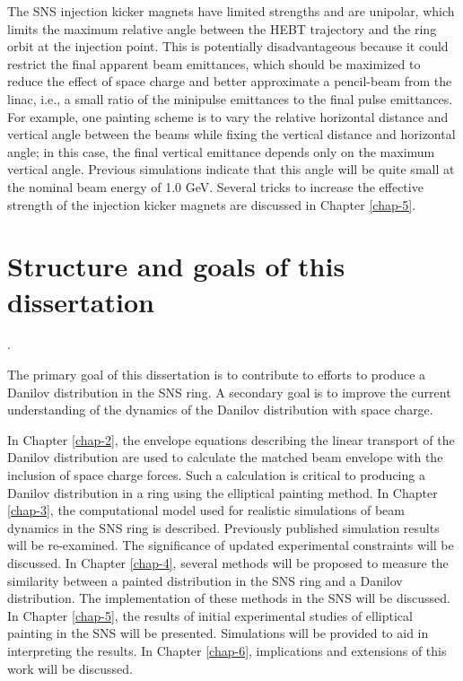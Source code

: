 The SNS injection kicker magnets have limited strengths and are unipolar, which limits the maximum relative angle between the HEBT trajectory and the ring orbit at the injection point. This is potentially disadvantageous because it could restrict the final apparent beam emittances, which should be maximized to reduce the effect of space charge and better approximate a pencil-beam from the linac, i.e., a small ratio of the minipulse emittances to the final pulse emittances. For example, one painting scheme is to vary the relative horizontal distance and vertical angle between the beams while fixing the vertical distance and horizontal angle; in this case, the final vertical emittance depends only on the maximum vertical angle. Previous simulations indicate that this angle will be quite small at the nominal beam energy of 1.0 GeV. Several tricks to increase the effective strength of the injection kicker magnets are discussed in Chapter \ref{chap-5}.


\section{Structure and goals of this dissertation}\label{sec:Goals of this dissertation}.

The primary goal of this dissertation is to contribute to efforts to produce a Danilov distribution in the SNS ring. A secondary goal is to improve the current understanding of the dynamics of the Danilov distribution with space charge.

In Chapter \ref{chap-2}, the envelope equations describing the linear transport of the Danilov distribution are used to calculate the matched beam envelope with the inclusion of space charge forces. Such a calculation is critical to producing a Danilov distribution in a ring using the elliptical painting method. In Chapter \ref{chap-3}, the computational model used for realistic simulations of beam dynamics in the SNS ring is described. Previously published simulation results will be re-examined. The significance of updated experimental constraints will be discussed. In Chapter \ref{chap-4}, several methods will be proposed to measure the similarity between a painted distribution in the SNS ring and a Danilov distribution. The implementation of these methods in the SNS will be discussed. In Chapter \ref{chap-5}, the results of initial experimental studies of elliptical painting in the SNS will be presented. Simulations will be provided to aid in interpreting the results. In Chapter \ref{chap-6}, implications and extensions of this work will be discussed.